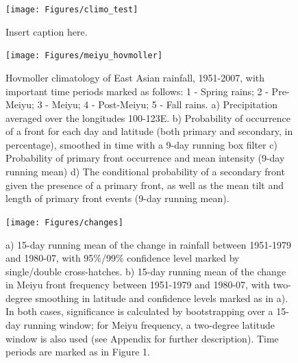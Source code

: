 \documentclass[draft,grl]{AGUTeX}
\begin{document}
%
%
%
%
%


\begin{figure}
\label{climo}
\noindent\texttt{[image: Figures/climo\_test]}
\caption{Insert caption here.}
\end{figure}

\begin{figure}
\noindent\texttt{[image: Figures/meiyu\_hovmoller]}
\caption{Hovmoller climatology of East Asian rainfall, 1951-2007, with important time periods marked as follows: 1 - Spring rains; 2 - Pre-Meiyu; 3 - Meiyu; 4 - Post-Meiyu; 5 - Fall rains. a) Precipitation averaged over the longitudes 100-123\textdegree E. b) Probability of occurrence of a front for each day and latitude (both primary and secondary, in percentage), smoothed in time with a 9-day running box filter c) Probability of primary front occurrence and mean intensity (9-day running mean) d) The conditional probability of a secondary front given the presence of a primary front, as well as the mean tilt and length of primary front events (9-day running mean).}
\label{dingchan}
\end{figure}

\begin{figure}[htbp]
\begin{center}
\texttt{[image: Figures/changes]}
\caption{a) 15-day running mean of the change in rainfall between 1951-1979 and 1980-07, with 95\%/99\% confidence level marked by single/double cross-hatches. b) 15-day running mean of the change in Meiyu front frequency between 1951-1979 and 1980-07, with two-degree smoothing in latitude and confidence levels marked as in a). In both cases, significance is calculated by bootstrapping over a 15-day running window; for Meiyu frequency, a two-degree latitude window is also used (see Appendix for further description). Time periods are marked as in Figure 1.}
\label{changes}
\end{center}
\end{figure}
\end{document}
